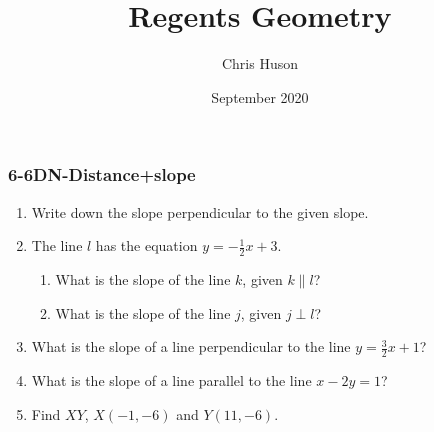\documentclass[12pt, twoside]{article}
\title{Regents Geometry}
\author{Chris Huson}
\date{September 2020}
\begin{document}
\subsubsection*{6-6DN-Distance+slope}
\begin{enumerate}
\item Write down the slope perpendicular to the given slope.
  \begin{enumerate}
  \end{enumerate} \vspace{1cm}

  
\item The line $l$ has the equation $y=-\frac{1}{2} x+3$.
  \begin{enumerate}
    \item What is the slope of the line $k$, given $k \parallel l$?
    \vspace{1.3cm}
    \item What is the slope of the line $j$, given $j \perp l$?
    \vspace{1.3cm}
  \end{enumerate}
  
\item What is the slope of a line perpendicular to the line $y=\frac{3}{2}x+1$?  \vspace{1.5cm}
\item What is the slope of a line parallel to the line $x-2y=1$?  \vspace{2cm}
 
 
\item Find $XY$, $X(-1,-6)$ and $Y(11,-6)$. \hspace{0.5cm}
     \vspace{1cm}


\end{enumerate}
\end{document}
